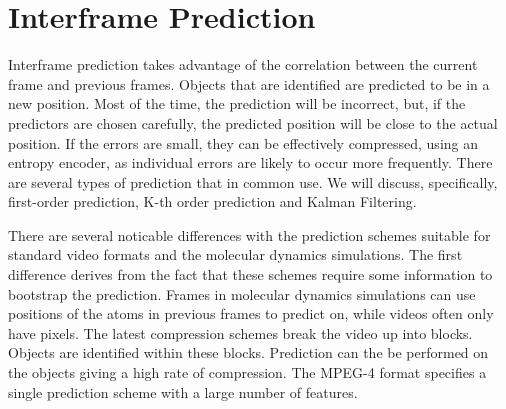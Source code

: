 \documentclass[a4paper,11pt]{report}
\begin{document}
% 
% 

\section{Interframe Prediction} 
\label{back_inter}

Interframe prediction takes advantage of the correlation between the current frame and previous frames. Objects that are identified are predicted to be in a new position. Most of the time, the prediction will be incorrect, but, if the predictors are chosen carefully, the predicted position will be close to the actual position. If the errors are small, they can be effectively compressed, using an entropy encoder, as individual errors are likely to occur more frequently. There are several types of prediction that in common use. We will discuss, specifically, first-order prediction, K-th order prediction and Kalman Filtering.

There are several noticable differences with the prediction schemes suitable for standard video formats and the molecular dynamics simulations. The first difference derives from the fact that these schemes require some information to bootstrap the prediction. Frames in molecular dynamics simulations can use positions of the atoms in previous frames to predict on, while videos often only have pixels. The latest compression schemes break the video up into blocks. Objects are identified within these blocks. Prediction can the be performed on the objects giving a high rate of compression. The MPEG-4 format specifies a single prediction scheme with a large number of features\cite{wiegand2003oha}. 
\end{document}

